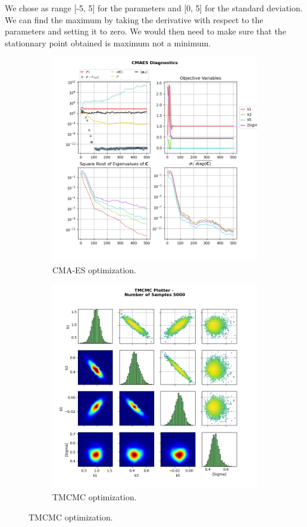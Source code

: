 \documentclass{article}
\begin{document}
    We chose as range [-5, 5] for the parameters and [0, 5] for the standard deviation.
    We can find the maximum by taking the derivative with respect to the parameters and setting it to zero.
    We would then need to make sure that the stationnary point obtained is maximum not a minimum.


    \begin{figure}[htb]
        \begin{subfigure}[b]{0.5\linewidth}
            \includegraphics[width=0.95\linewidth]{img/task3_b.png}
            \caption{CMA-ES optimization.}
        \end{subfigure}
        \begin{subfigure}[b]{0.5\linewidth}
            \includegraphics[width=0.95\linewidth]{img/task3_c.png}
            \caption{TMCMC optimization.}
        \end{subfigure}%


\end{figure}
\end{document}
